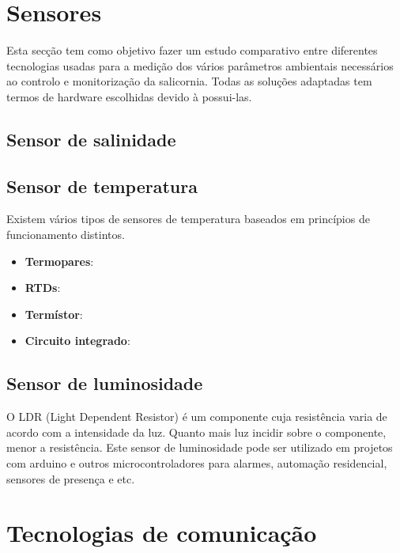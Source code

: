 \newpage
\section{Sensores}


Esta secção tem como objetivo fazer um estudo comparativo entre diferentes tecnologias usadas para a medição dos vários parâmetros ambientais necessários ao controlo e monitorização da salicornia. Todas as soluções adaptadas tem termos de hardware escolhidas devido à possui-las. 



\subsection{Sensor de salinidade}


\subsection{Sensor de temperatura }
Existem vários tipos de sensores de temperatura baseados em princípios de funcionamento distintos. 


\begin{itemize}
	\item \textbf{Termopares}: 
	\item \textbf{RTDs}:
	\item \textbf{Termístor}: 
	\item \textbf{Circuito integrado}: 
\end{itemize}








\newpage

\subsection{Sensor de luminosidade }


O LDR (Light Dependent Resistor) é um componente cuja resistência varia de acordo com a intensidade da luz. Quanto mais luz incidir sobre o componente, menor a resistência. Este sensor de luminosidade pode ser utilizado em projetos com arduino e outros microcontroladores para alarmes, automação residencial, sensores de presença e etc.





\newpage
\section{Tecnologias de comunicação}

